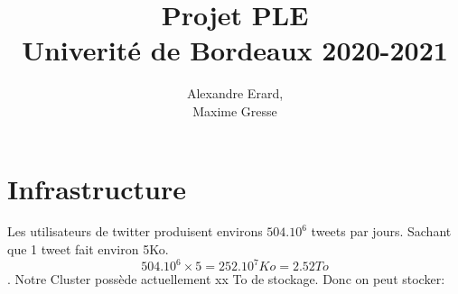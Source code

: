 \documentclass[a4paper]{article}
\title{Projet PLE \\ Univerité de Bordeaux 2020-2021}
\author{
    Alexandre Erard, \\
    Maxime Gresse
    }
\begin{document}
\maketitle
\section{Infrastructure}
Les utilisateurs de twitter produisent environs $504.10^6$ tweets par jours. Sachant que 1 tweet fait environ 5Ko.
\[ 504.10^6 \times 5 = 252.10^7 Ko = 2.52 To\].
Notre Cluster possède actuellement xx To de stockage. Donc on peut stocker:
\end{document}
